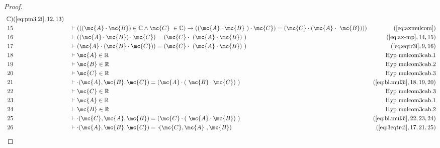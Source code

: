 \begin{proof}
\begin{align}
     ~\mathbb{C} )&(\mbox{\ref{eq:pm3.2i}},12,13)\notag
  \\ 15 &&  & \vdash ( ( ( \mc{A} \cdot \mc{B} ) \in \mathbb{C} \wedge \mc{C}
     ~\in \mathbb{C} ) \rightarrow ( ( \mc{A} \cdot \mc{B}
     ~) \cdot \mc{C} ) = ( \mc{C} \cdot ( \mc{A} \cdot
     ~\mc{B} ) ) )&(\mbox{\ref{eq:axmulcom}})\notag
  \\ 16 &&  & \vdash ( ( \mc{A} \cdot \mc{B} ) \cdot \mc{C} ) = ( \mc{C} \cdot
     ~( \mc{A} \cdot \mc{B} )
     ~)&(\mbox{\ref{eq:ax-mp}},14,15)\notag
  \\ 17 &&  & \vdash ( \mc{A} \cdot ( \mc{B} \cdot \mc{C} ) ) = ( \mc{C} \cdot
     ~( \mc{A} \cdot \mc{B} )
     ~)&(\mbox{\ref{eq:eqtr3i}},9,16)\notag
  \\ 18 &&  & \vdash \mc{A} \in
\mathbb{R}&\text{Hyp~mulcom3cab.1}\notag%
  \\ 19 &&  & \vdash \mc{B} \in
\mathbb{R}&\text{Hyp~mulcom3cab.2}\notag%
  \\ 20 &&  & \vdash \mc{C} \in
\mathbb{R}&\text{Hyp~mulcom3cab.3}\notag%
  \\ 21 &&  & \vdash \cdot( \mc{A} , \mc{B} , \mc{C} ) = ( \mc{A} \cdot (
     ~\mc{B} \cdot \mc{C} )
     ~)&(\mbox{\ref{eq:bl.mul3i}},18,19,20)\notag
  \\ 22 &&  & \vdash \mc{C} \in
\mathbb{R}&\text{Hyp~mulcom3cab.3}\notag%
  \\ 23 &&  & \vdash \mc{A} \in
\mathbb{R}&\text{Hyp~mulcom3cab.1}\notag%
  \\ 24 &&  & \vdash \mc{B} \in
\mathbb{R}&\text{Hyp~mulcom3cab.2}\notag%
  \\ 25 &&  & \vdash \cdot( \mc{C} , \mc{A} , \mc{B} ) = ( \mc{C} \cdot (
     ~\mc{A} \cdot \mc{B} )
     ~)&(\mbox{\ref{eq:bl.mul3i}},22,23,24)\notag
  \\ 26 &&  & \vdash \cdot( \mc{A} , \mc{B} , \mc{C} ) = \cdot( \mc{C} , \mc{A}
     ~, \mc{B} )&(\mbox{\ref{eq:3eqtr4i}},17,21,25)\notag
\end{align}
\end{proof}

